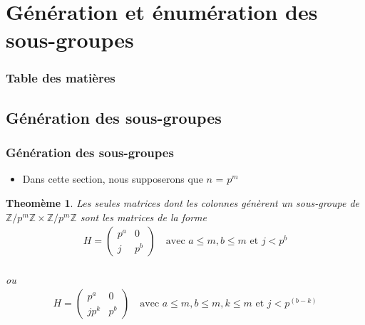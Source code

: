 \documentclass{beamer}
\newtheorem{thm}{Theomème}
\begin{document}
\section{Génération et énumération des sous-groupes}
\begin{frame}
\frametitle{Table des matières}
\tableofcontents[currentsection]
\end{frame}


\subsection{Génération des sous-groupes}
\begin{frame}
\frametitle{Génération des sous-groupes}
\begin{itemize}
    \item Dans cette section, nous supposerons que $n$ = ${p}^{m}$
\end{itemize}
\begin{thm}
    Les seules matrices dont les colonnes génèrent un sous-groupe de $\mathbb{Z}/p^m\mathbb{Z} \times \mathbb{Z}/p^m\mathbb{Z}$ sont les matrices de la forme
    \begin{align*}
        H = \begin{pmatrix}
        p^a & 0 \\
        j & p^b 
        \end{pmatrix}
        \quad \text{avec } a \leq m, b \leq m \text{ et } j < p^b    
    \end{align*}\\
    \center ou
    \begin{align*}
        H = \begin{pmatrix}
        p^a & 0 \\
        jp^k & p^b 
        \end{pmatrix}
        \quad \text{avec } a \leq m, b \leq m, k \leq m \text{ et } j < p^(b-k)
    \end{align*}
\end{thm}
\end{frame}
\end{document}
